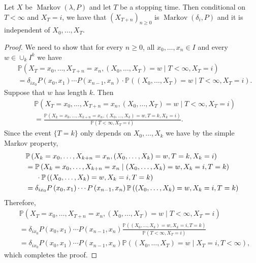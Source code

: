 \documentclass[a4paper]{article}
\begin{document}
\begin{theorem}
    Let $X$ be $\operatorname{Markov}(\lambda, P)$ and let $T$ be a stopping time. Then conditional on $T<\infty$ and $X_T=i$, we have that $\left(X_{T+n}\right)_{n \geq 0}$ is $\operatorname{Markov}\left(\delta_i, P\right)$ and it is independent of $X_0, \ldots, X_T$.
\end{theorem}
\begin{proof}
    We need to show that for every $n \geq 0$, all $x_0, \ldots, x_n \in I$ and every $w \in \cup_k I^k$ we have
    \[
    \begin{aligned}
    &\mathbb{P}\left(X_T=x_0, \ldots, X_{T+n}=x_n,\left(X_0, \ldots, X_T\right)=w \mid T<\infty, X_T=i\right) \\
    &=\delta_{i x_0} P\left(x_0, x_1\right) \cdots P\left(x_{n-1}, x_n\right) \cdot \mathbb{P}\left(\left(X_0, \ldots, X_T\right)=w \mid T<\infty, X_T=i\right) .
    \end{aligned}
    \]
    Suppose that $w$ has length $k$. Then
    \[
    \begin{aligned}
    &\mathbb{P}\left(X_T=x_0, \ldots, X_{T+n}=x_n,\left(X_0, \ldots, X_T\right)=w \mid T<\infty, X_T=i\right) \\
    &=\frac{\mathbb{P}\left(X_k=x_0, \ldots, X_{k+n}=x_n,\left(X_0, \ldots, X_k\right)=w, T=k, X_k=i\right)}{\mathbb{P}\left(T<\infty, X_T=i\right)} .
    \end{aligned}
    \]
    Since the event $\{T=k\}$ only depends on $X_0, \ldots, X_k$ we have by the simple Markov property,
    \[
    \begin{aligned}
    &\mathbb{P}\left(X_k=x_0, \ldots, X_{k+n}=x_n,\left(X_0, \ldots, X_k\right)=w, T=k, X_k=i\right) \\
    &=\mathbb{P}\left(X_k=x_0, \ldots, X_{k+n}=x_n \mid\left(X_0, \ldots, X_k\right)=w, X_k=i, T=k\right)\\ 
    &\hspace{1.5em} \cdot \mathbb{P}\left(\left(X_0, \ldots, X_k\right)=w, X_k=i, T=k\right) \\
    &=\delta_{i x_0} P\left(x_0, x_1\right) \cdots P\left(x_{n-1}, x_n\right) \mathbb{P}\left(\left(X_0, \ldots, X_k\right)=w, X_k=i, T=k\right)
    \end{aligned}
    \]
    Therefore,
    \[
    \begin{aligned}
    &\mathbb{P}\left(X_T=x_0, \ldots, X_{T+n}=x_n,\left(X_0, \ldots, X_T\right)=w \mid T<\infty, X_T=i\right) \\
    &=\delta_{i x_0} P\left(x_0, x_1\right) \cdots P\left(x_{n-1}, x_n\right) \frac{\mathbb{P}\left(\left(X_0, \ldots, X_k\right)=w, X_k=i, T=k\right)}{\mathbb{P}\left(T<\infty, X_T=i\right)} \\
    &=\delta_{i x_0} P\left(x_0, x_1\right) \cdots P\left(x_{n-1}, x_n\right) \mathbb{P}\left(\left(X_0, \ldots, X_T\right)=w \mid X_T=i, T<\infty\right),
    \end{aligned}
    \]
    which completes the proof.
\end{proof}
\end{document}
